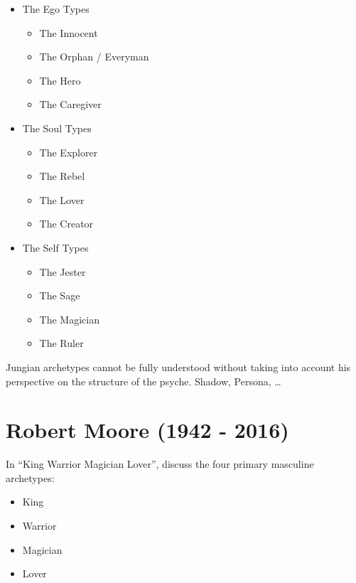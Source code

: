 \documentclass[]{book}
\providecommand{\tightlist}{%
  \setlength{\itemsep}{0pt}\setlength{\parskip}{0pt}}
\begin{document}
\begin{itemize}
\tightlist
\item
  The Ego Types

  \begin{itemize}
  \tightlist
  \item
    The Innocent
  \item
    The Orphan / Everyman
  \item
    The Hero
  \item
    The Caregiver
  \end{itemize}
\item
  The Soul Types

  \begin{itemize}
  \tightlist
  \item
    The Explorer
  \item
    The Rebel
  \item
    The Lover
  \item
    The Creator
  \end{itemize}
\item
  The Self Types

  \begin{itemize}
  \tightlist
  \item
    The Jester
  \item
    The Sage
  \item
    The Magician
  \item
    The Ruler
  \end{itemize}
\end{itemize}

Jungian archetypes cannot be fully understood without taking into account his perspective on the structure of the psyche. Shadow, Persona, \ldots{}

\hypertarget{robert-moore-1942---2016}{%
\section{Robert Moore (1942 - 2016)}\label{robert-moore-1942---2016}}

In ``King Warrior Magician Lover'', \citet{moore1991king} discuss the four primary masculine archetypes:

\begin{itemize}
\tightlist
\item
  King
\item
  Warrior
\item
  Magician
\item
  Lover
\end{itemize}
\end{document}
